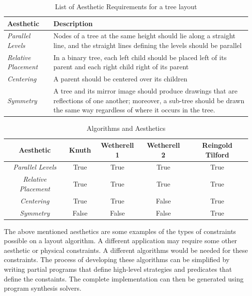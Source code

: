 \documentclass{article}
\begin{document}
\vspace{0.5cm}
\begin{table}[H]
  \begin{tabular}{|l|p{9cm}|}
    \hline \textbf{Aesthetic} & \textbf{Description} \\ \hline
    \textit{Parallel Levels} & Nodes of a tree at the same height
    should lie along a straight line, and the straight lines defining
    the levels should be parallel \\ \hline \textit{Relative
      Placement} & In a binary tree, each left child should be placed
    left of its parent and each right child right of its parent
    \\ \hline \textit{Centering} & A parent should be centered over
    its children \\ \hline \textit{Symmetry} & A tree and its mirror
    image should produce drawings that are reflections of one another;
    moreover, a sub-tree should be drawn the same way regardless of
    where it occurs in the tree. \\ \hline
  \end{tabular}
  \caption{List of Aesthetic Requirements for a tree layout}
  \label{table:aesthetics}
\end{table}
\vspace{0.5cm}


\vspace{0.5cm}
\begin{table}[H]
  \begin{tabular}{|c|c|c|c|c|}
    \hline
    \textbf{Aesthetic} & \textbf{Knuth} & \textbf{Wetherell 1} & \textbf{Wetherell 2} & \textbf{Reingold Tilford} \\ \hline
    \textit{Parallel Levels} & True & True & True & True \\ \hline
    \textit{Relative Placement} & True & True & True & True \\ \hline
    \textit{Centering} & True & True & False & True \\ \hline
    \textit{Symmetry} & False & False & False & True \\ \hline  
  \end{tabular}
  \caption{Algorithms and Aesthetics}
  \label{table:algoAesthetics}
\end{table}
\vspace{0.5cm}


The above mentioned aesthetics are some examples of the types of
constraints possible on a layout algorithm.  A different application
may require some other aesthetic or physical constraints.  A different
algorithms would be needed for these constraints.  The process of
developing these algorithms can be simplified by writing partial
programs that define high-level strategies and predicates that define
the constaints. The complete implementation can then be generated
using program synthesis solvers.
\end{document}
